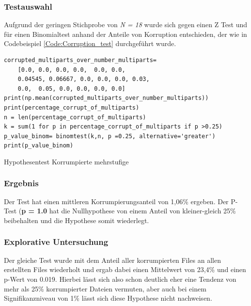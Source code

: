 \subsubsection{Testauswahl}
Aufgrund der geringen Stichprobe von \textit{N = 18} wurde sich gegen einen Z Test und für einen Binomialtest anhand der Anteile von Korruption entschieden, der wie in Codebeispiel \ref{Code:Corruption_test} durchgeführt wurde.

\begin{listing}
    \begin{verbatim}
corrupted_multiparts_over_number_multiparts= 
    [0.0, 0.0, 0.0, 0.0,  0.0, 0.0,
    0.04545, 0.06667, 0.0, 0.0, 0.0, 0.03,
    0.0,  0.05, 0.0, 0.0, 0.0, 0.0]
print(np.mean(corrupted_multiparts_over_number_multiparts))
print(percentage_corrupt_of_multiparts)
n = len(percentage_corrupt_of_multiparts)
k = sum(1 for p in percentage_corrupt_of_multiparts if p >0.25)
p_value_binom= binomtest(k,n, p =0.25, alternative='greater')
print(p_value_binom)
    \end{verbatim}
    \label{Code:Corruption_test}
    \caption{Hypothesentest Korrumpierte mehrstufige}
\end{listing}

\subsubsection{Ergebnis}
Der Test hat einen mittleren Korrumpierungsanteil von 1,06\% ergeben. Der P-Test (\textbf{p = 1.0} hat die Nullhypothese von einem Anteil von kleiner-gleich 25\% beibehalten und die Hypothese somit wiederlegt.

\subsubsection{Explorative Untersuchung}
Der gleiche Test wurde mit dem Anteil aller korrumpierten Files an allen erstellten Files wiederholt und ergab dabei einen Mittelwert von 23,4\% und einen p-Wert von 0.019. Hierbei lässt sich also schon deutlich eher eine Tendenz von mehr als 25\% korrumpierter Dateien vermuten, aber auch bei einem Signifikanzniveau von 1\% lässt sich diese Hypothese nicht nachweisen.

% 


